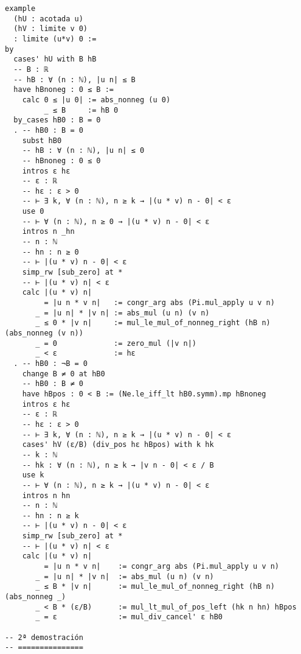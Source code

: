 \begin{verbatim}
example
  (hU : acotada u)
  (hV : limite v 0)
  : limite (u*v) 0 :=
by
  cases' hU with B hB
  -- B : ℝ
  -- hB : ∀ (n : ℕ), |u n| ≤ B
  have hBnoneg : 0 ≤ B :=
    calc 0 ≤ |u 0| := abs_nonneg (u 0)
         _ ≤ B     := hB 0
  by_cases hB0 : B = 0
  . -- hB0 : B = 0
    subst hB0
    -- hB : ∀ (n : ℕ), |u n| ≤ 0
    -- hBnoneg : 0 ≤ 0
    intros ε hε
    -- ε : ℝ
    -- hε : ε > 0
    -- ⊢ ∃ k, ∀ (n : ℕ), n ≥ k → |(u * v) n - 0| < ε
    use 0
    -- ⊢ ∀ (n : ℕ), n ≥ 0 → |(u * v) n - 0| < ε
    intros n _hn
    -- n : ℕ
    -- hn : n ≥ 0
    -- ⊢ |(u * v) n - 0| < ε
    simp_rw [sub_zero] at *
    -- ⊢ |(u * v) n| < ε
    calc |(u * v) n|
         = |u n * v n|   := congr_arg abs (Pi.mul_apply u v n)
       _ = |u n| * |v n| := abs_mul (u n) (v n)
       _ ≤ 0 * |v n|     := mul_le_mul_of_nonneg_right (hB n) (abs_nonneg (v n))
       _ = 0             := zero_mul (|v n|)
       _ < ε             := hε
  . -- hB0 : ¬B = 0
    change B ≠ 0 at hB0
    -- hB0 : B ≠ 0
    have hBpos : 0 < B := (Ne.le_iff_lt hB0.symm).mp hBnoneg
    intros ε hε
    -- ε : ℝ
    -- hε : ε > 0
    -- ⊢ ∃ k, ∀ (n : ℕ), n ≥ k → |(u * v) n - 0| < ε
    cases' hV (ε/B) (div_pos hε hBpos) with k hk
    -- k : ℕ
    -- hk : ∀ (n : ℕ), n ≥ k → |v n - 0| < ε / B
    use k
    -- ⊢ ∀ (n : ℕ), n ≥ k → |(u * v) n - 0| < ε
    intros n hn
    -- n : ℕ
    -- hn : n ≥ k
    -- ⊢ |(u * v) n - 0| < ε
    simp_rw [sub_zero] at *
    -- ⊢ |(u * v) n| < ε
    calc |(u * v) n|
         = |u n * v n|    := congr_arg abs (Pi.mul_apply u v n)
       _ = |u n| * |v n|  := abs_mul (u n) (v n)
       _ ≤ B * |v n|      := mul_le_mul_of_nonneg_right (hB n) (abs_nonneg _)
       _ < B * (ε/B)      := mul_lt_mul_of_pos_left (hk n hn) hBpos
       _ = ε              := mul_div_cancel' ε hB0

-- 2ª demostración
-- ===============


\end{verbatim}
